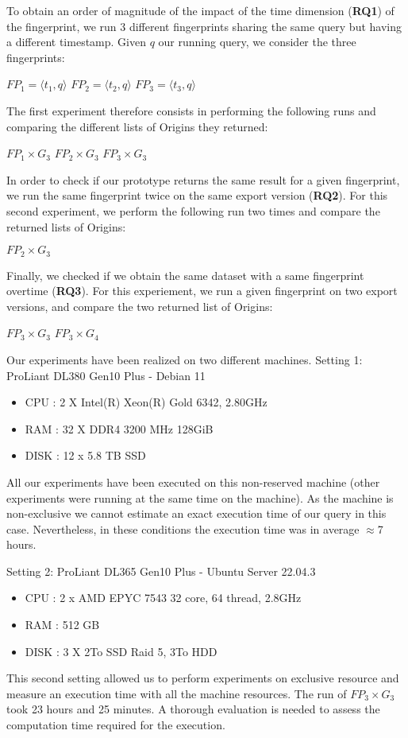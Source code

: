 To obtain an order of magnitude of the impact of the time dimension (\textbf{RQ1}) of the fingerprint, we run 3 different fingerprints sharing the same query but having a different timestamp. 
 Given $q$ our running query, we consider the three fingerprints:
\begin{center}
     $FP_1 = \langle t_1,q\rangle$    \;\;\;\;     $FP_2 = \langle t_2,q\rangle$   \;\;\;\;    $FP_3 = \langle t_3,q\rangle$ 
\end{center}
 The first experiment therefore consists in performing the following runs and comparing the different lists of Origins they returned:
\begin{center}
     $FP_1 \times G_3$    \;\;\;\;     $FP_2 \times G_3$   \;\;\;\;    $FP_3 \times G_3$ 
\end{center}

 In order to check if our prototype returns the same result for a given fingerprint, we run the same fingerprint twice on the same export version (\textbf{RQ2}). For this second experiment, we perform the following run two times and compare the returned lists of Origins: 
\begin{center}
     $FP_2 \times G_3$  
\end{center}

Finally, we checked if we obtain the same dataset with a same fingerprint overtime (\textbf{RQ3}). For this experiement, we run a given fingerprint on two export versions, and compare the two returned list of Origins:
  \begin{center}
     $FP_3 \times G_3$    \;\;\;\;     $FP_3 \times G_4$  
\end{center}
  

Our experiments have been realized on two different machines. 
Setting 1: ProLiant DL380 Gen10 Plus - Debian 11
\begin{itemize}
   \item CPU : 2  X Intel(R) Xeon(R) Gold 6342, 2.80GHz
   \item RAM :  32 X DDR4 3200 MHz 128GiB
   \item DISK : 12 x 5.8 TB SSD 
\end{itemize}
All our experiments have been executed on this non-reserved machine (other experiments were running at the same time on the machine). 
As the machine is non-exclusive we cannot estimate an exact execution time of our query in this case. 
Nevertheless, in these conditions the execution time was in average $\approx$7 hours.

Setting 2: ProLiant DL365 Gen10 Plus - Ubuntu Server 22.04.3
\begin{itemize}
    \item CPU : 2 x AMD EPYC 7543 32 core, 64 thread, 2.8GHz
    \item RAM : 512 GB
    \item DISK : 3 X 2To SSD Raid 5, 3To HDD
\end{itemize}
This second setting allowed us to perform experiments on exclusive resource and measure an execution time with all the machine resources. 
The run of $FP_3 \times G_3$ took 23 hours and 25 minutes. 
A thorough evaluation is needed to assess the computation time required for the execution. 

